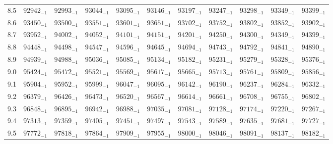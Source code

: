 \documentclass[10pt, a4paper]{article}
\begin{document}
\begin{center}
\begin{longtable}{c || c c c c c | c c c c c}
        8.5 & \({92942}_{-1}\) & \({92993}_{-1}\) & \({93044}_{-1}\) & \({93095}_{-1}\) & \({93146}_{-1}\) & \({93197}_{-1}\) & \({93247}_{-1}\) & \({93298}_{-1}\) & \({93349}_{-1}\) & \({93399}_{-1}\)\\
        8.6 & \({93450}_{-1}\) & \({93500}_{-1}\) & \({93551}_{-1}\) & \({93601}_{-1}\) & \({93651}_{-1}\) & \({93702}_{-1}\) & \({93752}_{-1}\) & \({93802}_{-1}\) & \({93852}_{-1}\) & \({93902}_{-1}\)\\
        8.7 & \({93952}_{-1}\) & \({94002}_{-1}\) & \({94052}_{-1}\) & \({94101}_{-1}\) & \({94151}_{-1}\) & \({94201}_{-1}\) & \({94250}_{-1}\) & \({94300}_{-1}\) & \({94349}_{-1}\) & \({94399}_{-1}\)\\
        8.8 & \({94448}_{-1}\) & \({94498}_{-1}\) & \({94547}_{-1}\) & \({94596}_{-1}\) & \({94645}_{-1}\) & \({94694}_{-1}\) & \({94743}_{-1}\) & \({94792}_{-1}\) & \({94841}_{-1}\) & \({94890}_{-1}\)\\
        8.9 & \({94939}_{-1}\) & \({94988}_{-1}\) & \({95036}_{-1}\) & \({95085}_{-1}\) & \({95134}_{-1}\) & \({95182}_{-1}\) & \({95231}_{-1}\) & \({95279}_{-1}\) & \({95328}_{-1}\) & \({95376}_{-1}\)\\
        \hline
        9.0 & \({95424}_{-1}\) & \({95472}_{-1}\) & \({95521}_{-1}\) & \({95569}_{-1}\) & \({95617}_{-1}\) & \({95665}_{-1}\) & \({95713}_{-1}\) & \({95761}_{-1}\) & \({95809}_{-1}\) & \({95856}_{-1}\)\\
        9.1 & \({95904}_{-1}\) & \({95952}_{-1}\) & \({95999}_{-1}\) & \({96047}_{-1}\) & \({96095}_{-1}\) & \({96142}_{-1}\) & \({96190}_{-1}\) & \({96237}_{-1}\) & \({96284}_{-1}\) & \({96332}_{-1}\)\\
        9.2 & \({96379}_{-1}\) & \({96426}_{-1}\) & \({96473}_{-1}\) & \({96520}_{-1}\) & \({96567}_{-1}\) & \({96614}_{-1}\) & \({96661}_{-1}\) & \({96708}_{-1}\) & \({96755}_{-1}\) & \({96802}_{-1}\)\\
        9.3 & \({96848}_{-1}\) & \({96895}_{-1}\) & \({96942}_{-1}\) & \({96988}_{-1}\) & \({97035}_{-1}\) & \({97081}_{-1}\) & \({97128}_{-1}\) & \({97174}_{-1}\) & \({97220}_{-1}\) & \({97267}_{-1}\)\\
        9.4 & \({97313}_{-1}\) & \({97359}_{-1}\) & \({97405}_{-1}\) & \({97451}_{-1}\) & \({97497}_{-1}\) & \({97543}_{-1}\) & \({97589}_{-1}\) & \({97635}_{-1}\) & \({97681}_{-1}\) & \({97727}_{-1}\)\\
        9.5 & \({97772}_{-1}\) & \({97818}_{-1}\) & \({97864}_{-1}\) & \({97909}_{-1}\) & \({97955}_{-1}\) & \({98000}_{-1}\) & \({98046}_{-1}\) & \({98091}_{-1}\) & \({98137}_{-1}\) & \({98182}_{-1}\)\\

\end{longtable}
\end{center}
\end{document}
